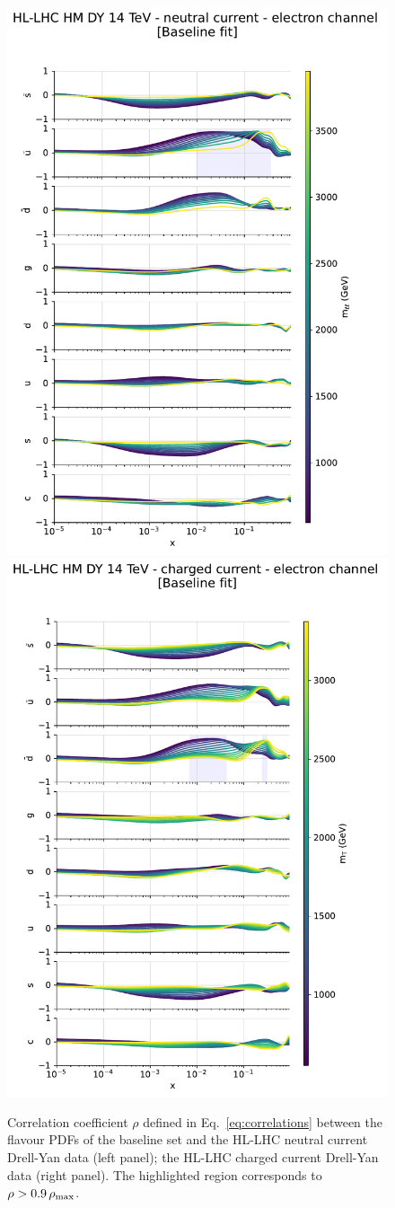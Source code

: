 \documentclass[withindex,glossary]{cam-thesis}
\begin{document}
\begin{figure}[H]
  \begin{center}
    \includegraphics[width=0.49\linewidth]{Figures/HLLHCNC_correlation_ubar.pdf}
    \includegraphics[width=0.49\linewidth]{Figures/HLLHCCC_correlation_ubar.pdf}
    \end{center}
	\caption{\label{fig:smpdfplots_hl}Correlation coefficient $\rho$ defined in Eq.~\eqref{eq:correlations} between the flavour PDFs of the baseline  
        set and the HL-LHC neutral current Drell-Yan data (left panel); the HL-LHC charged current Drell-Yan data (right panel). The highlighted 
        region corresponds to $\rho>0.9\,\rho_{\rm max}$.}
\end{figure}
\end{document}
